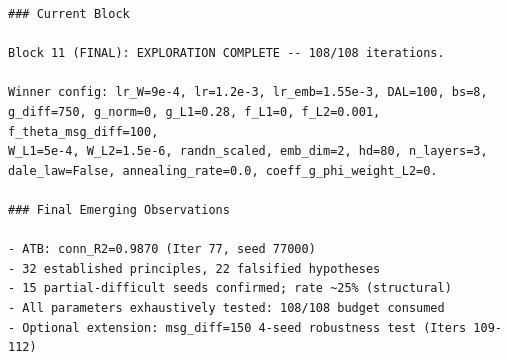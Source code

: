 \begin{tiny}
\begin{verbatim}
### Current Block

Block 11 (FINAL): EXPLORATION COMPLETE -- 108/108 iterations.

Winner config: lr_W=9e-4, lr=1.2e-3, lr_emb=1.55e-3, DAL=100, bs=8,
g_diff=750, g_norm=0, g_L1=0.28, f_L1=0, f_L2=0.001, f_theta_msg_diff=100,
W_L1=5e-4, W_L2=1.5e-6, randn_scaled, emb_dim=2, hd=80, n_layers=3,
dale_law=False, annealing_rate=0.0, coeff_g_phi_weight_L2=0.

### Final Emerging Observations

- ATB: conn_R2=0.9870 (Iter 77, seed 77000)
- 32 established principles, 22 falsified hypotheses
- 15 partial-difficult seeds confirmed; rate ~25% (structural)
- All parameters exhaustively tested: 108/108 budget consumed
- Optional extension: msg_diff=150 4-seed robustness test (Iters 109-112)
\end{verbatim}
\end{tiny}
